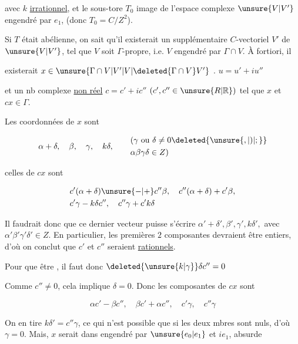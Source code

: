 avec $k$ \uline{irrationnel}, et le sous-tore $T_0$ image de l'espace complexe $\unsure{V|V'}$ engendré par $e_1$, (donc $T_0=C/Z^2$).

Si $T$ était abélienne, on sait qu'il existerait un supplémentaire $C$-vectoriel $V'$ de $\unsure{V|V'}$, tel que $V$ soit $\Gamma$-propre, i.e. $V$ engendré par $\Gamma\cap V$. À fortiori, il

existerait $x\in\unsure{\Gamma\cap V|V'|V|\deleted{\Gamma\cap V}V'}$  .  $u=u'+iu''$

et un nb complexe \uline{non réel} $c=c'+ic''$ $(c',c''\in\unsure{R|\mathbb{R}})$ tel que $x$ et $cx\in\Gamma$. 

Les coordonnées de $x$ sont

\[ \alpha+\delta,\quad\beta,\quad\gamma,\quad k\delta,\qquad
\begin{aligned} &(\gamma\text{ ou }\delta\ne0\deleted{\unsure{,|)|;}}\\ &\alpha\beta\gamma\delta\in Z) \end{aligned} \]

celles \deleted{$\unsure{\beta|\gamma|\substack{\beta\\\gamma\\\delta}}$} de $cx$ sont

\[ \begin{aligned} &c'(\alpha+\delta)\unsure{-|+}c''\beta,\quad c''(\alpha+\delta)+c'\beta,\\
&c'\gamma-k\delta c'',\quad c''\gamma+c'k\delta \end{aligned} \]

Il faudrait donc que ce dernier vecteur puisse s'écrire $\alpha'+\delta',\beta',\gamma',k\delta',$ avec $\alpha'\beta'\gamma'\delta'\in Z$. En particulier, les premières $2$ composantes devraient être entiers, d'où on conclut que $c'$ et $c''$ seraient \uline{rationnels}.

Pour que       être , il faut donc $\deleted{\unsure{k|\gamma}}\delta c''=0$ 

Comme $c''\ne0$, cela implique $\delta=0$. Donc les composantes de $cx$ sont

\[ \alpha c'-\beta c'',\quad\beta c'+\alpha c'',\quad c'\gamma,\quad c''\gamma \]

On en tire $k\delta'=c''\gamma$, ce qui n'est possible que si les deux mbres sont nuls, d'où $\gamma=0$. Mais,   $x$ serait dans  engendré par $\unsure{e_0|e_1}$ et $ie_1$, absurde

